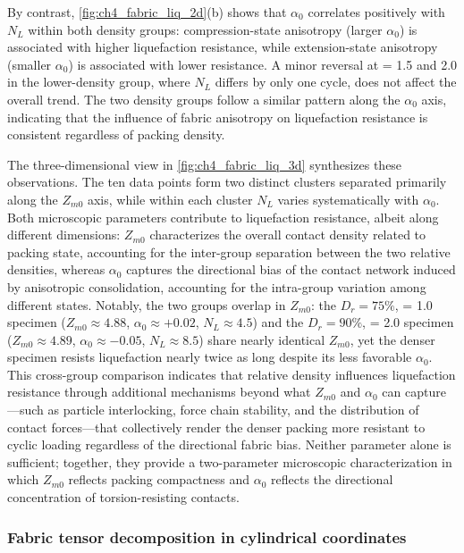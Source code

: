 \documentclass[../main]{subfiles}
\begin{document}
By contrast, \cref{fig:ch4_fabric_liq_2d}(b) shows that $\alpha_0$ correlates positively with $N_L$ within both density groups: compression-state anisotropy (larger $\alpha_0$) is associated with higher liquefaction resistance, while extension-state anisotropy (smaller $\alpha_0$) is associated with lower resistance. A minor reversal at \Kzero{} = 1.5 and 2.0 in the lower-density group, where $N_L$ differs by only one cycle, does not affect the overall trend. The two density groups follow a similar pattern along the $\alpha_0$ axis, indicating that the influence of fabric anisotropy on liquefaction resistance is consistent regardless of packing density.

The three-dimensional view in \cref{fig:ch4_fabric_liq_3d} synthesizes these observations. The ten data points form two distinct clusters separated primarily along the $Z_{m0}$ axis, while within each cluster $N_L$ varies systematically with $\alpha_0$. Both microscopic parameters contribute to liquefaction resistance, albeit along different dimensions: $Z_{m0}$ characterizes the overall contact density related to packing state, accounting for the inter-group separation between the two relative densities, whereas $\alpha_0$ captures the directional bias of the contact network induced by anisotropic consolidation, accounting for the intra-group variation among different \Kzero{} states. Notably, the two groups overlap in $Z_{m0}$: the $D_r = 75\%$, \Kzero{} = 1.0 specimen ($Z_{m0} \approx 4.88$, $\alpha_0 \approx +0.02$, $N_L \approx 4.5$) and the $D_r = 90\%$, \Kzero{} = 2.0 specimen ($Z_{m0} \approx 4.89$, $\alpha_0 \approx -0.05$, $N_L \approx 8.5$) share nearly identical $Z_{m0}$, yet the denser specimen resists liquefaction nearly twice as long despite its less favorable $\alpha_0$. This cross-group comparison indicates that relative density influences liquefaction resistance through additional mechanisms beyond what $Z_{m0}$ and $\alpha_0$ can capture---such as particle interlocking, force chain stability, and the distribution of contact forces---that collectively render the denser packing more resistant to cyclic loading regardless of the directional fabric bias. Neither parameter alone is sufficient; together, they provide a two-parameter microscopic characterization in which $Z_{m0}$ reflects packing compactness and $\alpha_0$ reflects the directional concentration of torsion-resisting contacts.

\subsubsection{Fabric tensor decomposition in cylindrical coordinates}
\end{document}
